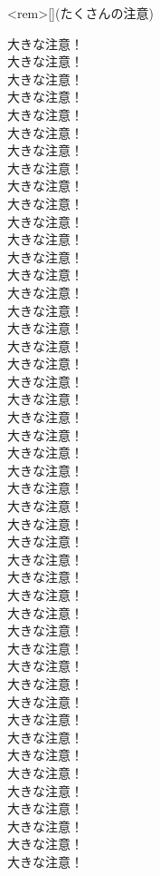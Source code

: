 \documentclass[11pt, a4paper]{ltjsarticle}
\begin{document}
\begin{statementsp}<rem>[](たくさんの注意)
    \begin{tcolorbox}
        大きな注意！\\ 
        大きな注意！\\ 
        大きな注意！\\ 
        大きな注意！\\ 
        大きな注意！\\ 
        大きな注意！\\ 
        大きな注意！\\ 
        大きな注意！\\ 
        大きな注意！\\ 
        大きな注意！\\ 
        大きな注意！\\ 
        大きな注意！\\ 
        大きな注意！\\ 
        大きな注意！\\ 
        大きな注意！\\ 
        大きな注意！\\ 
        大きな注意！\\ 
        大きな注意！\\ 
        大きな注意！\\ 
        大きな注意！\\ 
        大きな注意！\\ 
        大きな注意！\\ 
        大きな注意！\\ 
        大きな注意！\\ 
        大きな注意！\\ 
        大きな注意！\\ 
        大きな注意！\\ 
        大きな注意！\\ 
        大きな注意！\\ 
        大きな注意！\\ 
        大きな注意！\\ 
        大きな注意！\\ 
        大きな注意！\\ 
        大きな注意！\\ 
        大きな注意！\\ 
        大きな注意！\\ 
        大きな注意！\\ 
        大きな注意！\\ 
        大きな注意！\\ 
        大きな注意！\\ 
        大きな注意！\\ 
        大きな注意！\\ 
        大きな注意！\\ 
        大きな注意！\\ 
        大きな注意！\\ 
        大きな注意！\\ 
        大きな注意！\\
    \end{tcolorbox}
\end{statementsp}
\end{document}
